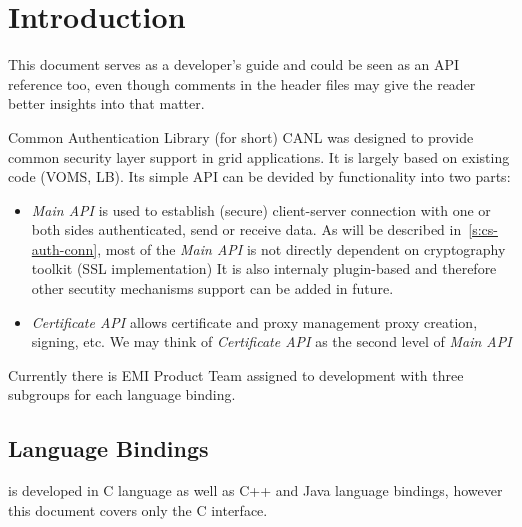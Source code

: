 %
%

\section{Introduction}

This document serves as a developer's guide and could be
seen as an API reference too, even though comments in
the header files may give the reader better insights into that matter.

Common Authentication Library (\CANL for short)
CANL was designed to provide common security layer support in grid 
applications. It is largely based on existing code (VOMS, LB). Its 
simple API can be devided by functionality into two parts:

\begin{itemize}
\item \textit{\CANL Main API} is used to establish (secure) client-server
connection with one or both sides authenticated, send or receive data.
As will be described in~\ref{s:cs-auth-conn}, most of the \textit{Main API} 
is not directly dependent on cryptography toolkit (SSL implementation) It is
also internaly plugin-based and therefore other secutity mechanisms support can
be added in future.
\item \textit{\CANL Certificate API} allows certificate and proxy management \eg
proxy creation, signing, etc. We may think of \textit{Certificate API} as the
second level of \textit{Main API}
\end{itemize}

Currently there is EMI Product Team assigned to \CANL development with three
subgroups for each language binding.

\subsection{Language Bindings}
\CANL is developed in C language as well as C++ and Java language bindings,
however this document covers only the C interface.

